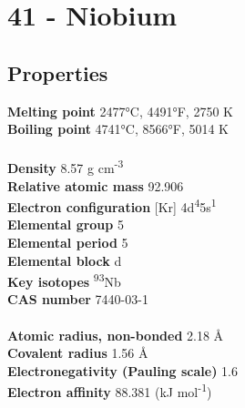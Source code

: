 \section{41 - Niobium}
\label{sec:elem-niobium}
\subsection{Properties}
\textbf{Melting point} 2477°C, 4491°F, 2750 K\\
\textbf{Boiling point} 4741°C, 8566°F, 5014 K\\
\\
\textbf{Density} 8.57 g cm\textsuperscript{-3}\\
\textbf{Relative atomic mass} 92.906\\
\textbf{Electron configuration} [Kr] 4d\textsuperscript{4}5s\textsuperscript{1}\\
\textbf{Elemental group} 5\\
\textbf{Elemental period} 5\\
\textbf{Elemental block} d\\
\textbf{Key isotopes} \textsuperscript{93}Nb\\
\textbf{CAS number} 7440-03-1\\
\\
\textbf{Atomic radius, non-bonded} 2.18 Å\\
\textbf{Covalent radius} 1.56 Å\\
\textbf{Electronegativity (Pauling scale)} 1.6\\
\textbf{Electron affinity} 88.381 (kJ mol\textsuperscript{-1})\\